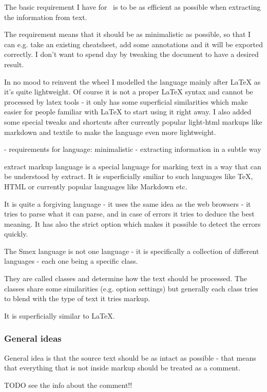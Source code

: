 \documentclass[a4paper,11pt]{article}
\newcommand{\probe}{\emph{\sc{probe{}}}}
\begin{document}
The basic requirement I have for \probe\ is to be as efficient as possible
when extracting the information from text.

The requirement means that it should be as minimalistic as possible, so that I
can e.g. take an existing cheatsheet, add some annotations and it will be
exported correctly. I don't want to spend day by tweaking the document to have
a desired result.

In no mood to reinvent the wheel I modelled the language mainly after LaTeX as
it's quite lightweight. Of course it is not a proper LaTeX syntax and cannot be
processed by latex tools - it only has some superficial similarities which make
easier for people familiar with LaTeX to start using it right away.  I also
added some special tweaks and shortcuts after currently popular light-html
markups like markdown and textile to make the language even more lightweight.

- requirements for language: minimalistic - extracting information in a subtle
way

extract markup language is a special language for marking text in a way that can
be understood by extract. It is superficially smiliar to such languages like TeX,
HTML or currently popular languages like Markdown etc.

It is quite a forgiving language - it uses the same idea as the web
browsers - it tries to parse what it can parse, and in case of errors it tries
to deduce the best meaning. It has also the strict option which makes it
possible to detect the errors quickly.

The Smex language is not one language - it is specifically a collection of
different languages - each one being a specific class.

They are called classes and determine how the text should be processed. The
classes share some similarities (e.g. option settings) but generally each class
tries to blend with the type of text it tries markup.

It is superficially similar to LaTeX.

\subsubsection{General ideas}
General idea is that the source text should be as intact as possible - that
means that everything that is not inside markup should be treated as a comment.

TODO see the info about the comment!!
\end{document}
